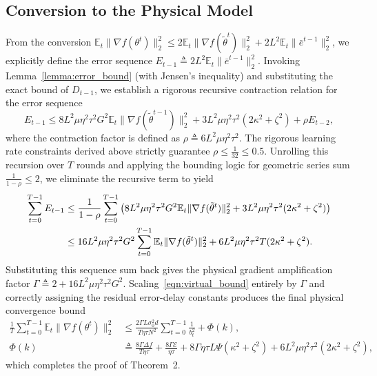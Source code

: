 \documentclass[conference]{IEEEtran}
\begin{document}
\subsection{Conversion to the Physical Model}
From the conversion $\mathbb{E}_t\|\nabla f(\theta^t)\|_2^2 \le 2\mathbb{E}_t\|\nabla f(\tilde{\theta}^t)\|_2^2 + 2L^2\mathbb{E}_t\|\bar{e}^{t-1}\|_2^2$, we explicitly define the error sequence $E_{t-1} \triangleq 2L^2\mathbb{E}_t\|\bar{e}^{t-1}\|_2^2$.
Invoking Lemma~\ref{lemma:error_bound} (with Jensen's inequality) and substituting the exact bound of $D_{t-1}$, we establish a rigorous recursive contraction relation for the error sequence
\begin{equation}
    E_{t-1} \le 8L^2\mu\eta^2\tau^2 G^2 \mathbb{E}_t\|\nabla f(\tilde{\theta}^{t-1})\|_2^2 + 3L^2\mu\eta^2\tau^2(2\kappa^2+\zeta^2) + \rho E_{t-2},
\end{equation}
where the contraction factor is defined as $\rho \triangleq 6L^2\mu\eta^2\tau^2$. The rigorous learning rate constraints derived above strictly guarantee $\rho \le \frac{1}{32} \le 0.5$. 
Unrolling this recursion over $T$ rounds and applying the bounding logic for geometric series sum $\frac{1}{1-\rho} \le 2$, we eliminate the recursive term to yield
\begin{align}
    \sum_{t=0}^{T-1} E_{t-1} &\le \frac{1}{1-\rho} \sum_{t=0}^{T-1} \left( 8L^2\mu\eta^2\tau^2 G^2 \mathbb{E}_t\|\nabla f(\tilde{\theta}^{t})\|_2^2 + 3L^2\mu\eta^2\tau^2(2\kappa^2+\zeta^2) \right) \notag \\
    &\le 16L^2\mu\eta^2\tau^2 G^2 \sum_{t=0}^{T-1}\mathbb{E}_t\|\nabla f(\tilde{\theta}^t)\|_2^2 + 6L^2\mu\eta^2\tau^2 T(2\kappa^2+\zeta^2).
\end{align}
Substituting this sequence sum back gives the physical gradient amplification factor $\Gamma \triangleq 2 + 16L^2\mu\eta^2\tau^2 G^2$.
Scaling~\eqref{eqn:virtual_bound} entirely by $\Gamma$ and correctly assigning the residual error-delay constants produces the final physical convergence bound
\begin{align}
    \frac1T\sum_{t=0}^{T-1}\mathbb{E}_t\|\nabla f(\theta^t)\|_2^2 &\le \frac{2\Gamma L\sigma_0^2 d}{T\eta\tau N^2}\sum_{t=0}^{T-1}\frac{1}{b_t^2} + \Phi(k),\\
    \Phi(k) &\triangleq \frac{8\Gamma \Delta f}{T\eta\tau} + \frac{8\Gamma\mathcal{E}}{\eta\tau} + 8\Gamma\eta\tau L \Psi(\kappa^2+\zeta^2) + 6L^2\mu\eta^2\tau^2(2\kappa^2+\zeta^2),
\end{align}
which completes the proof of Theorem~2.
\end{document}
